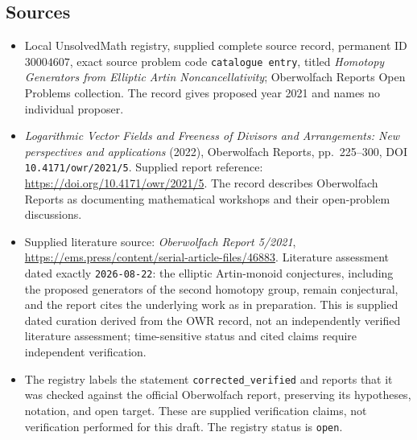 \documentclass[11pt]{article}
\begin{document}
\subsection{Sources}
\begin{itemize}
\item Local UnsolvedMath registry, supplied complete source record, permanent ID \(30004607\), exact source problem code \texttt{catalogue entry}, titled \emph{Homotopy Generators from Elliptic Artin Noncancellativity}; Oberwolfach Reports Open Problems collection. The record gives proposed year 2021 and names no individual proposer.
\item \emph{Logarithmic Vector Fields and Freeness of Divisors and Arrangements: New perspectives and applications} (2022), Oberwolfach Reports, pp.~225--300, DOI \texttt{10.4171/owr/2021/5}. Supplied report reference: \url{https://doi.org/10.4171/owr/2021/5}. The record describes Oberwolfach Reports as documenting mathematical workshops and their open-problem discussions.
\item Supplied literature source: \emph{Oberwolfach Report 5/2021}, \url{https://ems.press/content/serial-article-files/46883}. Literature assessment dated exactly \texttt{2026-08-22}: the elliptic Artin-monoid conjectures, including the proposed generators of the second homotopy group, remain conjectural, and the report cites the underlying work as in preparation. This is supplied dated curation derived from the OWR record, not an independently verified literature assessment; time-sensitive status and cited claims require independent verification.
\item The registry labels the statement \texttt{corrected\_verified} and reports that it was checked against the official Oberwolfach report, preserving its hypotheses, notation, and open target. These are supplied verification claims, not verification performed for this draft. The registry status is \texttt{open}.
\end{itemize}
\end{document}
